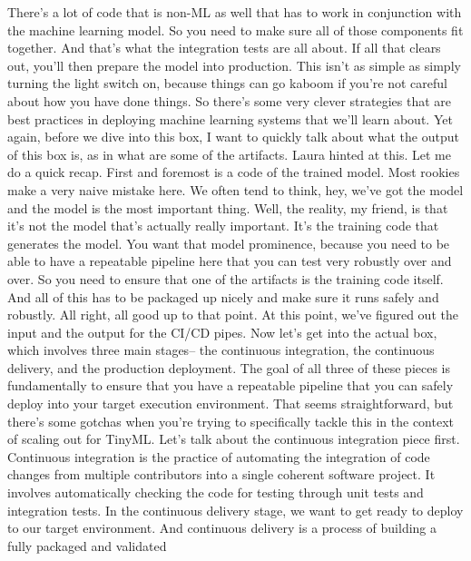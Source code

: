 {{{    There's a lot of code that is non-ML as well that has to work in conjunction
    with the machine learning model.
    So you need to make sure all of those components fit together.
    And that's what the integration tests are all about.
    If all that clears out, you'll then prepare the model into production.
    This isn't as simple as simply turning the light switch on,
    because things can go kaboom if you're not
    careful about how you have done things.
    So there's some very clever strategies that
    are best practices in deploying machine learning
    systems that we'll learn about.
    Yet again, before we dive into this box, I
    want to quickly talk about what the output of this box is,
    as in what are some of the artifacts.
    Laura hinted at this.
    Let me do a quick recap.
    First and foremost is a code of the trained model.
    Most rookies make a very naive mistake here.
    We often tend to think, hey, we've got the model
    and the model is the most important thing.
    Well, the reality, my friend, is that it's not the model that's
    actually really important.
    It's the training code that generates the model.
    You want that model prominence, because you
    need to be able to have a repeatable pipeline here
    that you can test very robustly over and over.
    So you need to ensure that one of the artifacts is the training code itself.
    And all of this has to be packaged up nicely and make sure it runs safely
    and robustly.
    All right, all good up to that point.
    At this point, we've figured out the input and the output
    for the CI/CD pipes.
    Now let's get into the actual box, which involves three main stages--
    the continuous integration, the continuous delivery, and the production
    deployment.
    The goal of all three of these pieces is fundamentally
    to ensure that you have a repeatable pipeline
    that you can safely deploy into your target execution environment.
    That seems straightforward, but there's some gotchas
    when you're trying to specifically tackle
    this in the context of scaling out for TinyML.
    Let's talk about the continuous integration piece first.
    Continuous integration is the practice of automating
    the integration of code changes from multiple contributors
    into a single coherent software project.
    It involves automatically checking the code
    for testing through unit tests and integration tests.
    In the continuous delivery stage, we want
    to get ready to deploy to our target environment.
    And continuous delivery is a process of building a fully packaged and validated
}}}
